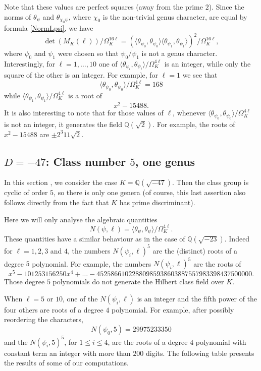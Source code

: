 \documentclass[twoside,10pt]{article}
\newcommand{\Q}{\mathbb{Q}}
\begin{document}
Note that these values are perfect squares (away from the prime $2$). Since the norms of $\theta_\psi$ and $\theta_{\chi_0\psi}$, where $\chi_0$ is the non-trivial genus character, are equal by formula \ref{NormLpsi}, we have
\[\det(M_K(\ell))/\Omega_K^{16\ell}=(\langle\theta_{\psi_0},\theta_{\psi_0}\rangle \langle\theta_{\psi_1},\theta_{\psi_1}\rangle)^2/\Omega_K^{16\ell},\]
where $\psi_0$ and $\psi_1$ were chosen so that $\psi_0/\psi_1$ is not a genus character. Interestingly, for $\ell=1,\dots,10$ one of $\langle\theta_{\psi_i},\theta_{\psi_i}\rangle/\Omega_K^{4\ell}$ is an integer, while only the square of the other is an integer. For example, for $\ell=1$ we see that
\[\langle\theta_{\psi_0},\theta_{\psi_0}\rangle/\Omega_K^{4\ell} = 168\]
while $\langle\theta_{\psi_1},\theta_{\psi_1}\rangle/\Omega_K^{4\ell}$ is a root of
\[x^2 - 15488.\]
It is also interesting to note that for those values of $\ell$, whenever $\langle\theta_{\psi_0},\theta_{\psi_0}\rangle/\Omega_K^{4\ell}$ is not an integer, it generates the field $\Q(\sqrt{2})$. For example, the roots of $x^2 - 15488$ are $\pm2^{3}11\sqrt{2}$.

\subsection{$D=-47$: Class number $5$, one genus}
In this section , we consider the case $K=\Q(\sqrt{-47})$. Then the class group is cyclic of order $5$, so there is only one genera (of course, this last assertion also follows directly from the fact that $K$ has prime discriminant).

Here we will only analyse the algebraic quantities
\[N(\psi,\ell) = \langle\theta_{\psi},\theta_{\psi}\rangle/\Omega_K^{4\ell}.\]
These quantities have a similar behaviour as in the case of $\Q(\sqrt{-23})$. Indeed for $\ell=1,2,3$ and $4$, the numbers $N(\psi_i,\ell)^5$ are the (distinct) roots of a degree $5$ polynomial. For example, the numbers $N(\psi_i,\ell)^5$ are the roots of
\[x^5 - 101253156250x^4 +\dots- 45258661022880985938603887557983398437500000.\]
Those degree $5$ polynomials do not generate the Hilbert class field over $K$.

When $\ell=5$ or $10$, one of the $N(\psi_i,\ell)$ is an integer and the fifth power of the four others are roots of a degree $4$ polynomial. For example, after possibly reordering the characters,
\[N(\psi_0,5) = 29975233350\]
and the $N(\psi_i,5)^5$, for $1\leq i\leq 4$, are the roots of a degree $4$ polynomial with constant term an integer with more than $200$ digits. The following table presents the results of some of our computations.
\end{document}
